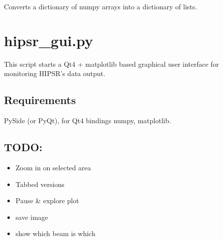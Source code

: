 \documentclass[letterpaper,10pt,english]{sphinxmanual}
\begin{document}

\begin{fulllineitems}
\label{software:hipsr_server.toJson}
Converts a dictionary of numpy arrays into a dictionary of lists.

\end{fulllineitems}

\label{software:module-hipsr_gui}

\section{hipsr\_gui.py}
\label{software:hipsr-gui-py}
This script starts a Qt4 + matplotlib based graphical user interface for monitoring HIPSR's data output.


\subsection{Requirements}
\label{software:requirements}
PySide (or PyQt), for Qt4 bindings
numpy, matplotlib.


\subsection{TODO:}
\label{software:todo}\begin{itemize}
\item {} 
Zoom in on selected area

\item {} 
Tabbed versions

\item {} 
Pause \& explore plot

\item {} 
save image

\item {} 
show which beam is which

\end{itemize}
\end{document}
